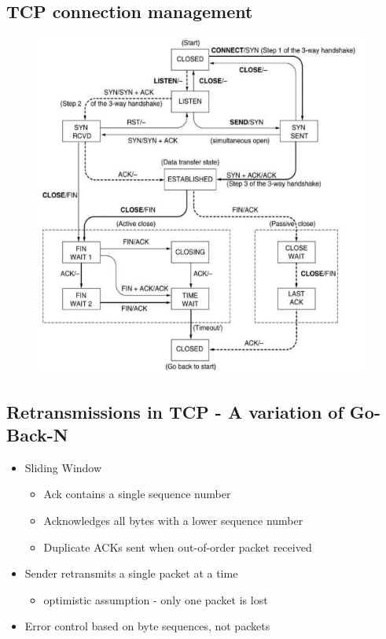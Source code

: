 \documentclass[../resumosRCOM.tex]{subfiles}
\begin{document}
\subsection{TCP connection management}
\begin{figure}[h]
    \centering
    \includegraphics[width=11cm]{images/trans8.JPG}
\end{figure}

\subsection{Retransmissions in TCP - A variation of Go-Back-N}
\begin{itemize}
    \item Sliding Window
    \begin{itemize}
        \item Ack contains a single sequence number
        \item Acknowledges all bytes with a lower sequence number
        \item Duplicate ACKs sent when out-of-order packet received
    \end{itemize}
    \item  Sender retransmits a single packet at a time
    \begin{itemize}
        \item optimistic assumption - only one packet is lost
    \end{itemize}
    \item Error control based on byte sequences, not packets
\end{itemize}
\end{document}
